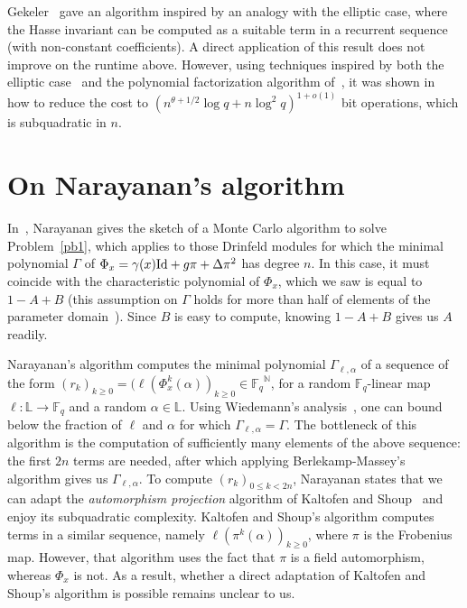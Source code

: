 \documentclass[sigconf]{acmart}
\newcommand{\F}{\mathbb{F}}
\newcommand{\N}{\mathbb{N}}
\renewcommand{\L}{\mathbb{L}}
\begin{document}
Gekeler~\cite[Prop.~3.7]{frobdist} gave an algorithm inspired by an
analogy with the elliptic case, where the Hasse invariant can be
computed as a suitable term in a recurrent sequence (with non-constant
coefficients). A direct application of this result does not improve on
the runtime above. However, using techniques inspired by both the
elliptic case~\cite{BoGaSc07} and the polynomial factorization
algorithm of~\cite{KaSh98}, it was shown
in~\cite{eschost2017arXiv171200669D} how to reduce the cost to
$(n^{\theta+1/2} \log q + n \log^2 q)^{1+o(1)}$ bit operations, which
is subquadratic in $n$.


\section{On Narayanan's algorithm}\label{sec:narayanan}

In~\cite[Sec.~3.1]{Narayanan18}, Narayanan gives the sketch of a Monte
Carlo algorithm to solve Problem~\ref{pb1}, which applies to those
Drinfeld modules for which the minimal polynomial $\Gamma$ of
$\Phi_x=\gamma(x){\rm Id} + g \pi + \Delta \pi^2$ has degree $n$. In
this case, it must coincide with the characteristic polynomial of
$\Phi_x$, which we saw is equal to $1-A+B$ (this assumption on
$\Gamma$ holds for more than half of elements of the parameter
domain~\cite[Th.~3.6]{Narayanan18}). Since $B$ is easy to compute,
knowing $1-A+B$ gives us $A$ readily.

Narayanan's algorithm computes the minimal polynomial
$\Gamma_{\ell,\alpha}$ of a sequence of the form $(r_k)_{k \ge 0} =
(\ell(\Phi_x^k(\alpha))_{k\ge 0} \in {\F_q}^\N$, for a random $\F_q$-linear
map $\ell:\L\to\F_q$ and a random $\alpha \in \L$. Using Wiedemann's
analysis~\cite{Wiedemann:1986:SSL:13738.13744}, one can bound below
the fraction of $\ell$ and $\alpha$ for which
$\Gamma_{\ell,\alpha}=\Gamma$.
The bottleneck of this algorithm is the computation of sufficiently
many elements of the above sequence: the first $2n$ terms are needed,
after which applying Berlekamp-Massey's algorithm gives us
$\Gamma_{\ell,\alpha}$. To compute $(r_k)_{0 \le k < 2n}$, Narayanan states
that we can adapt the {\em automorphism projection} algorithm of
Kaltofen and Shoup~\cite{KaSh98} and enjoy its subquadratic
complexity. Kaltofen and Shoup's algorithm computes terms in a similar
sequence, namely $\ell(\pi^k(\alpha))_{k\ge 0}$, where $\pi$ is 
the Frobenius map. However, that
algorithm uses the fact that $\pi$ is a field automorphism, whereas
$\Phi_x$ is not. As a result, whether a direct adaptation of Kaltofen
and Shoup's algorithm is possible remains unclear to us.
\end{document}
